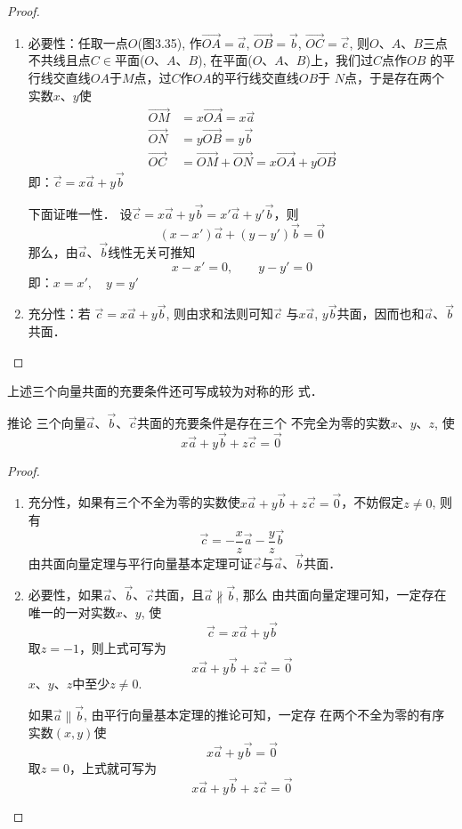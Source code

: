 \begin{proof}
\begin{enumerate}
    \item 必要性：任取一点$O$(图3.35), 作$\Vec{OA}=\vec{a}$, 
    $\Vec{OB}=\vec{b}$, $\Vec{OC}=\vec{c}$, 则$O$、$A$、$B$三点不共线且点$C\in $平面($O$、$A$、$B$), 在平面($O$、$A$、$B$)上，我们过$C$点作$OB$
    的平行线交直线$OA$于$M$点，过$C$作$OA$的平行线交直线$OB$于
    $N$点，于是存在两个实数$x$、$y$使
\[\begin{split}
     \Vec{OM}&=x\Vec{OA}=x\vec{a}\\
     \Vec{ON}&=y\Vec{OB}=y\vec{b}\\
     \Vec{OC}&=\Vec{OM}+\Vec{ON}=x\Vec{OA}+y\Vec{OB}
\end{split}\]
即：$\vec{c}=x\vec{a}+y\vec{b}$

下面证唯一性．
设$\vec{c}=x\vec{a}+y\vec{b}=x'\vec{a}+y'\vec{b}$，则\
\[(x-x')\vec{a}+(y-y')\vec{b}=\vec{0}\]
那么，由$\vec{a}$、$\vec{b}$线性无关可推知
\[x-x'=0,\qquad y-y'=0\]
即：$x=x',\quad y=y'$

\item 充分性：若
$\vec{c}=x\vec{a}+y\vec{b}$, 则由求和法则可知$\vec{c}$
与$x\vec{a}$, $y\vec{b}$共面，因而也和$\vec{a}$、$\vec{b}$共面．
\end{enumerate}
\end{proof}

上述三个向量共面的充要条件还可写成较为对称的形
式．

\begin{blk}
    {推论} 三个向量$\vec{a}$、$\vec{b}$、$\vec{c}$共面的充要条件是存在三个
不完全为零的实数$x$、$y$、$z$, 使
\[x\vec{a}+y\vec{b}+z\vec{c}=\vec{0}\]
\end{blk}

\begin{proof}
\begin{enumerate}
    \item 充分性，如果有三个不全为零的实数使$x\vec{a}+y\vec{b}+z\vec{c}=\vec{0}$，不妨假定$z\ne 0$, 则有
\[\vec{c}=-\frac{x}{z}\vec{a}-\frac{y}{z}\vec{b}\]
    由共面向量定理与平行向量基本定理可证$\vec{c}$与$\vec{a}$、$\vec{b}$共面．

\item 必要性，如果$\vec{a}$、$\vec{b}$、$\vec{c}$共面，且$\vec{a}\nparallel \vec{b}$, 那么
由共面向量定理可知，一定存在唯一的一对实数$x$、$y$, 使
\[\vec{c}=x\vec{a}+y\vec{b}\]
取$z=-1$，则上式可写为
\[x\vec{a}+y\vec{b}+z\vec{c}=\vec{0}\]
$x$、$y$、$z$中至少$z\ne 0$.

如果$\vec{a}\parallel \vec{b}$, 由平行向量基本定理的推论可知，一定存
在两个不全为零的有序实数$(x,y)$使
\[x\vec{a}+y\vec{b}=\vec{0}\]
取$z=0$，上式就可写为
\[x\vec{a}+y\vec{b}+z\vec{c}=\vec{0}\]
\end{enumerate}
\end{proof}    

